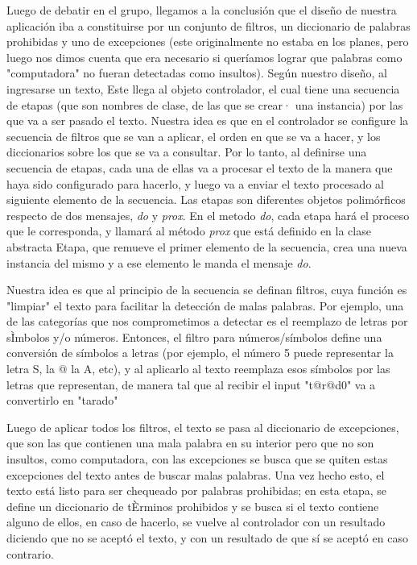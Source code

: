 Luego de debatir en el grupo, llegamos a la conclusión que el diseño de nuestra aplicación iba a constituirse por un conjunto de filtros, un diccionario de palabras prohibidas y uno de excepciones (este originalmente no estaba en los planes, pero luego nos dimos cuenta que era necesario si queríamos lograr que palabras como "computadora" no fueran detectadas como insultos).
Según nuestro diseño, al ingresarse un texto, Este llega al objeto controlador, el cual tiene una secuencia de etapas (que son nombres de clase, de las que se crear· una instancia) por las que va a ser pasado el texto. Nuestra idea es que en el controlador se configure la secuencia de filtros que se van a aplicar, el orden en que se va a hacer, y los diccionarios sobre los que se va a consultar. Por lo tanto, al definirse una secuencia de etapas, cada una de ellas va a procesar el texto de la manera que haya sido configurado para hacerlo, y luego va a enviar el texto procesado al siguiente elemento de la secuencia. Las etapas son diferentes objetos polimórficos respecto de dos mensajes, \textit{do} y \textit{prox}. En el metodo \textit{do}, cada etapa hará el proceso que le corresponda, y llamará al método \textit{prox} que está definido en la clase abstracta Etapa, que remueve el primer elemento de la secuencia, crea una nueva instancia del mismo y a ese elemento le manda el mensaje \textit{do}.

Nuestra idea es que al principio de la secuencia se definan filtros, cuya función es "limpiar" el texto para facilitar la detección de malas palabras. Por ejemplo, una de las categorías que nos comprometimos a detectar es el reemplazo de letras por sÌmbolos y/o números. Entonces, el filtro para números/símbolos define una conversión de símbolos a letras (por ejemplo, el número 5 puede representar la letra S, la @ la A, etc), y al aplicarlo al texto reemplaza esos símbolos por las letras que representan, de manera tal que al recibir el input "t@r@d0" va a convertirlo en "tarado"

Luego de aplicar todos los filtros, el texto se pasa al diccionario de excepciones, que son las que contienen una mala palabra en su interior pero que no son insultos, como computadora, con las excepciones se busca que se quiten estas excepciones del texto antes de buscar malas palabras. Una vez hecho esto, el texto está listo para ser chequeado por palabras prohibidas; en esta etapa, se define un diccionario de tÈrminos prohibidos y se busca si el texto contiene alguno de ellos, en caso de hacerlo, se vuelve al controlador con un resultado diciendo que no se aceptó el texto, y con un resultado de que sí se aceptó en caso contrario. 

